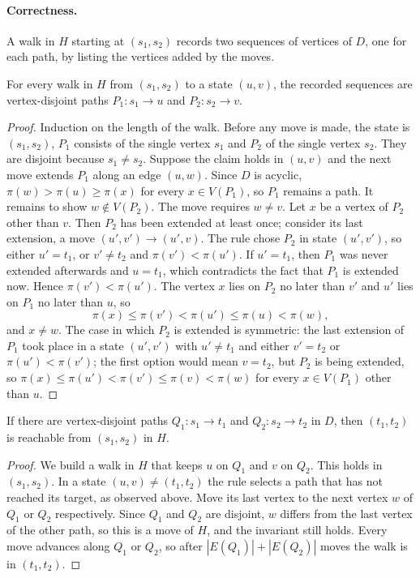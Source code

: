 \paragraph{Correctness.} A walk in $H$ starting at $(s_1,s_2)$ records
two sequences of vertices of $D$, one for each path, by listing the
vertices added by the moves.

\begin{lemma}\label{lem:vdp-sound}
For every walk in $H$ from $(s_1,s_2)$ to a state $(u,v)$, the recorded
sequences are vertex-disjoint paths $P_1\colon s_1\to u$ and
$P_2\colon s_2\to v$.
\end{lemma}

\begin{proof}
Induction on the length of the walk. Before any move is made, the state
is $(s_1,s_2)$, $P_1$ consists of the single vertex $s_1$ and $P_2$ of
the single vertex $s_2$. They are disjoint because $s_1\neq s_2$. Suppose the claim holds in $(u,v)$ and
the next move extends $P_1$ along an edge $(u,w)$. Since $D$ is acyclic,
$\pi(w)>\pi(u)\ge\pi(x)$ for every $x\in V(P_1)$, so $P_1$ remains a
path. It remains to show $w\notin V(P_2)$. The move requires $w\neq v$.
Let $x$ be a vertex of $P_2$ other than $v$. Then $P_2$ has been
extended at least once; consider its last extension, a move
$(u',v')\to(u',v)$. The rule chose $P_2$ in state $(u',v')$, so either
$u'=t_1$, or $v'\neq t_2$ and $\pi(v')<\pi(u')$. If $u'=t_1$, then $P_1$
was never extended afterwards and $u=t_1$, which contradicts the fact
that $P_1$ is extended now. Hence $\pi(v')<\pi(u')$. The vertex $x$ lies
on $P_2$ no later than $v'$ and $u'$ lies on $P_1$ no later than $u$, so
\[
  \pi(x)\le\pi(v')<\pi(u')\le\pi(u)<\pi(w),
\]
and $x\neq w$. The case in which $P_2$ is extended is symmetric: the
last extension of $P_1$ took place in a state $(u',v')$ with $u'\neq
t_1$ and either $v'=t_2$ or $\pi(u')<\pi(v')$; the first option would
mean $v=t_2$, but $P_2$ is being extended, so
$\pi(x)\le\pi(u')<\pi(v')\le\pi(v)<\pi(w)$ for every $x\in V(P_1)$
other than $u$.
\end{proof}

\begin{lemma}\label{lem:vdp-complete}
If there are vertex-disjoint paths $Q_1\colon s_1\to t_1$ and
$Q_2\colon s_2\to t_2$ in $D$, then $(t_1,t_2)$ is reachable from
$(s_1,s_2)$ in $H$.
\end{lemma}

\begin{proof}
We build a walk in $H$ that keeps $u$ on $Q_1$ and $v$ on $Q_2$. This
holds in $(s_1,s_2)$. In a state $(u,v)\neq(t_1,t_2)$ the rule selects a
path that has not reached its target, as observed above. Move its last
vertex to the next vertex $w$ of $Q_1$ or $Q_2$ respectively. Since
$Q_1$ and $Q_2$ are disjoint, $w$ differs from the last vertex of the
other path, so this is a move of $H$, and the invariant still holds.
Every move advances along $Q_1$ or $Q_2$, so after
$|E(Q_1)|+|E(Q_2)|$ moves the walk is in $(t_1,t_2)$.
\end{proof}

